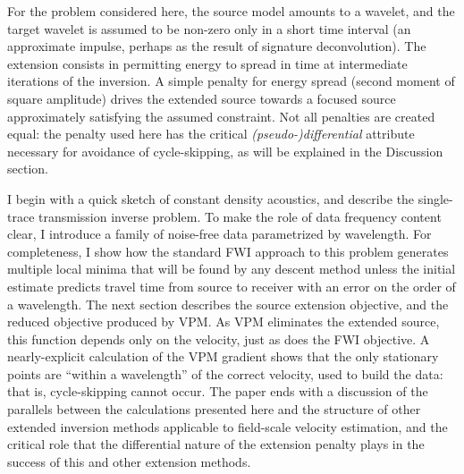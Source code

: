 For the problem considered here, the source model amounts 
to a wavelet, and the target wavelet is assumed to be non-zero only in
a short time
interval (an approximate impulse, perhaps as the result of signature deconvolution). The extension consists in permitting energy to spread
in time at intermediate iterations of the inversion. A simple penalty
for energy spread (second moment of square amplitude) drives the
extended source towards a focused source approximately satisfying the assumed
constraint. Not all penalties are created equal: the penalty used here
has the critical {\em (pseudo-)differential} attribute necessary for
avoidance of cycle-skipping, as will be explained in the Discussion section.


I begin with a quick sketch of constant density acoustics,
and describe the single-trace transmission inverse problem. To make
the role of data frequency content clear, I introduce a family of
noise-free data parametrized by wavelength. For completeness, I show how
the standard FWI approach to this problem generates multiple local
minima that will be found by any descent method unless the initial
estimate predicts travel time from source to receiver with an error
on the order of a wavelength. The next section describes the source
extension objective, and the reduced objective
produced by VPM. As VPM eliminates the extended source, this
function depends only on the velocity, just as does the FWI objective.  A
nearly-explicit calculation of the VPM gradient 
shows that the only stationary points are ``within a wavelength'' of
the correct velocity, used to build the data: that is, cycle-skipping
cannot occur. The paper ends with a discussion of the parallels
between the calculations presented here and the structure of other
extended inversion methods applicable to field-scale velocity
estimation, and the critical role that the differential nature of the
extension penalty plays in the success of this and other extension methods.

